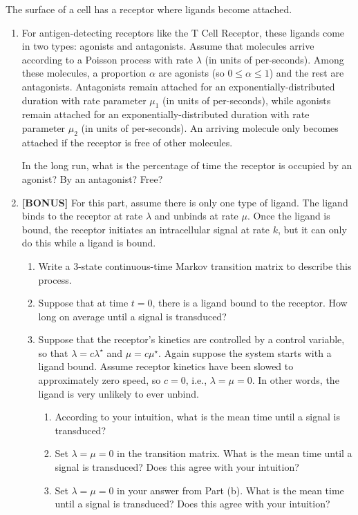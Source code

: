 \documentclass[12pt,letterpaper]{article}
\begin{document}
The surface of a cell has a receptor where ligands become attached. 

\begin{enumerate}


\item For antigen-detecting receptors like the T Cell Receptor, these ligands come in two types: agonists and antagonists. 
Assume that molecules arrive according to a Poisson process with rate $\lambda$ (in units of per-seconds). 
Among these molecules, a proportion $\alpha$ are agonists (so $0\leq \alpha \leq 1$) and the rest are antagonists. 
Antagonists remain attached for an exponentially-distributed duration with rate parameter $\mu_1$ (in units of per-seconds), while agonists remain attached for an exponentially-distributed duration with rate parameter $\mu_2$ (in units of per-seconds). 
An arriving molecule only becomes attached if the receptor is free of other molecules. 

In the long run, what is the percentage of time the receptor is occupied by an agonist? By an antagonist? Free?

\item \textbf{[BONUS]} For this part, assume there is only one type of ligand. The ligand binds to the receptor at rate $\lambda$ and unbinds at rate $\mu$. Once the ligand is bound, the receptor initiates an intracellular signal at rate $k$, but it can only do this while a ligand is bound. 

\begin{enumerate}
\item Write a 3-state continuous-time Markov transition matrix to describe this process. 

\item Suppose that at time $t=0$, there is a ligand bound to the receptor. How long on average until a signal is transduced?

\item Suppose that the receptor's kinetics are controlled by a control variable, so that $\lambda = c \lambda^\star$ and $\mu = c\mu^\star$. Again suppose the system starts with a ligand bound. Assume receptor kinetics have been slowed to approximately zero speed, so $c=0$, i.e., $\lambda=\mu=0$. In other words, the ligand is very unlikely to ever unbind.

\begin{enumerate}
\item According to your intuition, what is the mean time until a signal is transduced?
\item Set $\lambda=\mu=0$ in the transition matrix. What is the mean time until a signal is transduced? Does this agree with your intuition?
\item Set $\lambda=\mu=0$ in your answer from Part (b). What is the mean time until a signal is transduced? Does this agree with your intuition?
\end{enumerate}

\end{enumerate}


\end{enumerate}
\end{document}
